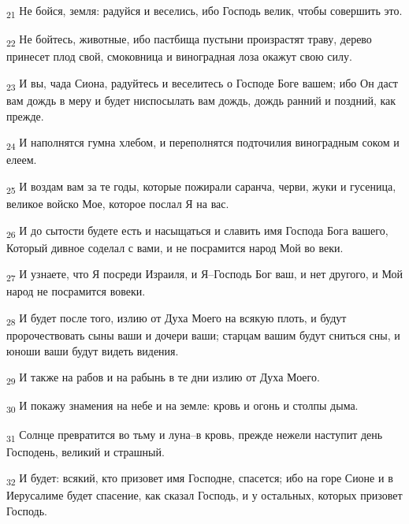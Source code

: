 \begin{tcolorbox}
\textsubscript{21} Не бойся, земля: радуйся и веселись, ибо Господь велик, чтобы совершить это.
\end{tcolorbox}
\begin{tcolorbox}
\textsubscript{22} Не бойтесь, животные, ибо пастбища пустыни произрастят траву, дерево принесет плод свой, смоковница и виноградная лоза окажут свою силу.
\end{tcolorbox}
\begin{tcolorbox}
\textsubscript{23} И вы, чада Сиона, радуйтесь и веселитесь о Господе Боге вашем; ибо Он даст вам дождь в меру и будет ниспосылать вам дождь, дождь ранний и поздний, как прежде.
\end{tcolorbox}
\begin{tcolorbox}
\textsubscript{24} И наполнятся гумна хлебом, и переполнятся подточилия виноградным соком и елеем.
\end{tcolorbox}
\begin{tcolorbox}
\textsubscript{25} И воздам вам за те годы, которые пожирали саранча, черви, жуки и гусеница, великое войско Мое, которое послал Я на вас.
\end{tcolorbox}
\begin{tcolorbox}
\textsubscript{26} И до сытости будете есть и насыщаться и славить имя Господа Бога вашего, Который дивное соделал с вами, и не посрамится народ Мой во веки.
\end{tcolorbox}
\begin{tcolorbox}
\textsubscript{27} И узнаете, что Я посреди Израиля, и Я--Господь Бог ваш, и нет другого, и Мой народ не посрамится вовеки.
\end{tcolorbox}
\begin{tcolorbox}
\textsubscript{28} И будет после того, излию от Духа Моего на всякую плоть, и будут пророчествовать сыны ваши и дочери ваши; старцам вашим будут сниться сны, и юноши ваши будут видеть видения.
\end{tcolorbox}
\begin{tcolorbox}
\textsubscript{29} И также на рабов и на рабынь в те дни излию от Духа Моего.
\end{tcolorbox}
\begin{tcolorbox}
\textsubscript{30} И покажу знамения на небе и на земле: кровь и огонь и столпы дыма.
\end{tcolorbox}
\begin{tcolorbox}
\textsubscript{31} Солнце превратится во тьму и луна--в кровь, прежде нежели наступит день Господень, великий и страшный.
\end{tcolorbox}
\begin{tcolorbox}
\textsubscript{32} И будет: всякий, кто призовет имя Господне, спасется; ибо на горе Сионе и в Иерусалиме будет спасение, как сказал Господь, и у остальных, которых призовет Господь.
\end{tcolorbox}
